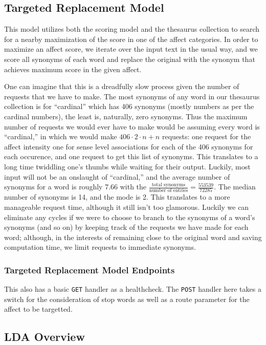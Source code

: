 \documentclass[11pt, twoside, reqno]{book}
\begin{document}
\subsection{Targeted Replacement Model}

This model utilizes both the scoring model and the thesaurus collection to search for a nearby maximization of the score in one of the affect categories. In order to maximize an affect score, we iterate over the input text in the usual way, and we score all synonyms of each word and replace the original with the synonym that achieves maximum score in the given affect.

One can imagine that this is a dreadfully slow process given the number of requests that we have to make. The most synonyms of any word in our thesaurus collection is for ``cardinal'' which has 406 synonyms (mostly numbers as per the cardinal numbers), the least is, naturally, zero synonyms. Thus the maximum number of requests we would ever have to make would be assuming every word is ``cardinal,'' in which we would make $406 \cdot 2 \cdot n + n$ requests: one request for the affect intensity one for sense level associations for each of the 406 synonyms for each occurence, and one request to get this list of synonyms. This translates to a long time twiddling one's thumbs while waiting for their output. Luckily, most input will not be an onslaught of ``cardinal,'' and the average number of synonyms for a word is roughly 7.66 with the $\frac{\text{total synonyms}}{\text{number of entries}} = \frac{553539}{72285}$. The median number of synonyms is 14, and the mode is 2. This translates to a more manageable request time, although it still isn't too glamorous. Luckily we can eliminate any cycles if we were to choose to branch to the synonyms of a word's synonyms (and so on) by keeping track of the requests we have made for each word; although, in the interests of remaining close to the original word and saving computation time, we limit requests to immediate synonyms.

\subsubsection{\textbf{Targeted Replacement Model Endpoints}}

This also has a basic \texttt{GET} handler as a healthcheck. The \texttt{POST} handler here takes a switch for the consideration of stop words as well as a route parameter for the affect to be targetted.

\subsection{LDA Overview}
\end{document}
